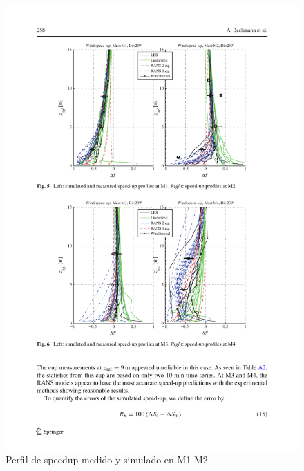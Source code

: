 \documentclass[mathserif,10pt]{beamer}
\begin{document}
\begin{frame}{}
	\begin{figure}[H]
		\centering
		\includegraphics[width=1.0\linewidth,trim={2.7cm 14.4cm 1.9cm 2cm},clip]{fig/an1/bolund3.pdf}%
		\caption{Perfil de speedup medido y simulado en M1-M2.}
		\label{fig:an1_speed_masts}
	\end{figure}
\end{frame}
\end{document}
